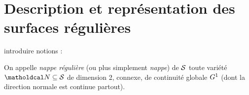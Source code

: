 \section{Description et représentation des surfaces régulières \piecewise}

\label{section:description_surface_G1_piecewise}
introduire notions \cite{rossignac1985} : 

\begin{definition}
	On appelle \emph{nappe régulière} (ou plus simplement \emph{nappe}) de $\mathcal{S}$ toute variété $\nappe \subseteq \interface$ de dimension 2, connexe, de continuité globale $G^{1}$ (\ie dont la direction normale est continue partout).
\end{definition}

